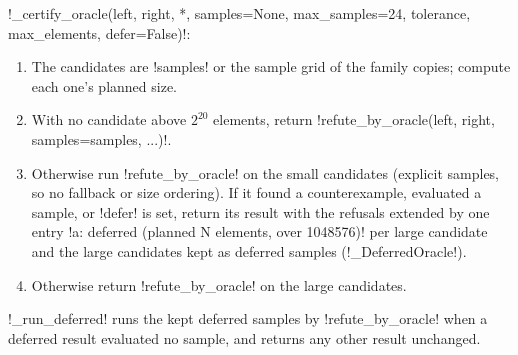 \begin{algorithm}\label{alg:proofs-certify-oracle}
\py!_certify_oracle(left, right, *, samples=None, max_samples=24, tolerance, max_elements, defer=False)!:
\begin{enumerate}
\item The candidates are \py!samples! or the sample grid of the family copies; compute each one's planned size.
\item With no candidate above $2^{20}$ elements, return \py!refute_by_oracle(left, right, samples=samples, ...)!.
\item Otherwise run \py!refute_by_oracle! on the small candidates (explicit samples, so no fallback or size ordering). If it found a counterexample, evaluated a sample, or \py!defer! is set, return its result with the refusals extended by one entry \code!{a}: deferred (planned N elements, over 1048576)! per large candidate and the large candidates kept as deferred samples (\py!_DeferredOracle!).
\item Otherwise return \py!refute_by_oracle! on the large candidates.
\end{enumerate}
\py!_run_deferred! runs the kept deferred samples by \py!refute_by_oracle! when a deferred result evaluated no sample, and returns any other result unchanged.
\end{algorithm}

